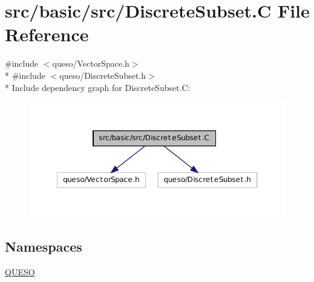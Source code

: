 \hypertarget{_discrete_subset_8_c}{\section{src/basic/src/\-Discrete\-Subset.C File Reference}
\label{_discrete_subset_8_c}
}
{\ttfamily \#include $<$queso/\-Vector\-Space.\-h$>$}\\*
{\ttfamily \#include $<$queso/\-Discrete\-Subset.\-h$>$}\\*
Include dependency graph for Discrete\-Subset.\-C\-:
\nopagebreak
\begin{figure}[H]
\begin{center}
\leavevmode
\includegraphics[width=350pt]{_discrete_subset_8_c__incl}
\end{center}
\end{figure}
\subsection*{Namespaces}
\begin{DoxyCompactItemize}
\item 
\hyperlink{namespace_q_u_e_s_o}{Q\-U\-E\-S\-O}
\end{DoxyCompactItemize}
